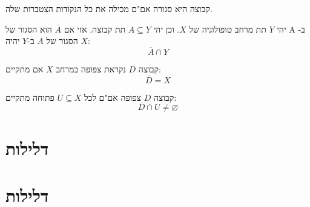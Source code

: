 \documentclass{tstextbook}
\begin{document}
\begin{corollary}
קבוצה היא סגורה אם"ם מכילה את כל הנקודות הצטברות שלה.

\end{corollary}
\begin{proposition}
יהי \(Y\) תת מרחב טופולוגיה של \(X\). וכן יהי \(A\subseteq Y\) תת קבוצה. אזי אם \(\overline{A}\) הוא הסגור של A ב-\(X\) הסגור של \(A\) ב-\(Y\) יהיה:
$$\overline{A} \cap  Y$$

\end{proposition}
\begin{definition}
קבוצה \(D\) נקראת צפופה במרחב \(X\) אם מתקיים:
$$\overline{D} =X$$

\end{definition}
\begin{proposition}
קבוצה \(D\) צפופה אם"ם לכל \(U\subseteq X\) פתוחה מתקיים:
$$D\cap U\neq \varnothing $$

\end{proposition}
\section{דלילות}

\section{דלילות}
\end{document}
